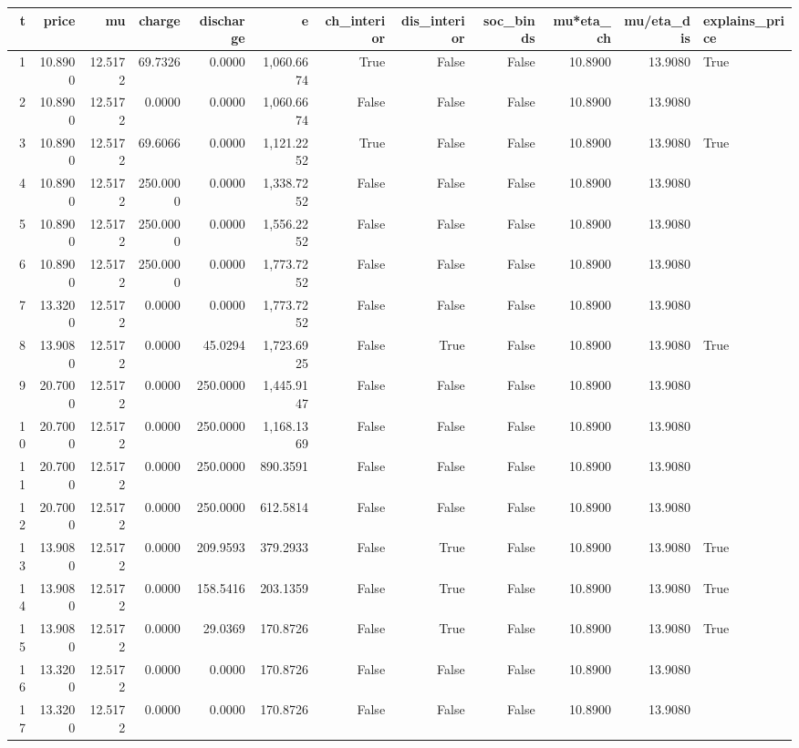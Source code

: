 \begin{tabular}{rrrrrrrrrrrl}
\toprule
t & price & mu & charge & discharge & e & ch\_interior & dis\_interior & soc\_binds & mu*eta\_ch & mu/eta\_dis & explains\_price \\
\midrule
1 & 10.8900 & 12.5172 & 69.7326 & 0.0000 & 1,060.6674 & True & False & False & 10.8900 & 13.9080 & True \\
2 & 10.8900 & 12.5172 & 0.0000 & 0.0000 & 1,060.6674 & False & False & False & 10.8900 & 13.9080 &  \\
3 & 10.8900 & 12.5172 & 69.6066 & 0.0000 & 1,121.2252 & True & False & False & 10.8900 & 13.9080 & True \\
4 & 10.8900 & 12.5172 & 250.0000 & 0.0000 & 1,338.7252 & False & False & False & 10.8900 & 13.9080 &  \\
5 & 10.8900 & 12.5172 & 250.0000 & 0.0000 & 1,556.2252 & False & False & False & 10.8900 & 13.9080 &  \\
6 & 10.8900 & 12.5172 & 250.0000 & 0.0000 & 1,773.7252 & False & False & False & 10.8900 & 13.9080 &  \\
7 & 13.3200 & 12.5172 & 0.0000 & 0.0000 & 1,773.7252 & False & False & False & 10.8900 & 13.9080 &  \\
8 & 13.9080 & 12.5172 & 0.0000 & 45.0294 & 1,723.6925 & False & True & False & 10.8900 & 13.9080 & True \\
9 & 20.7000 & 12.5172 & 0.0000 & 250.0000 & 1,445.9147 & False & False & False & 10.8900 & 13.9080 &  \\
10 & 20.7000 & 12.5172 & 0.0000 & 250.0000 & 1,168.1369 & False & False & False & 10.8900 & 13.9080 &  \\
11 & 20.7000 & 12.5172 & 0.0000 & 250.0000 & 890.3591 & False & False & False & 10.8900 & 13.9080 &  \\
12 & 20.7000 & 12.5172 & 0.0000 & 250.0000 & 612.5814 & False & False & False & 10.8900 & 13.9080 &  \\
13 & 13.9080 & 12.5172 & 0.0000 & 209.9593 & 379.2933 & False & True & False & 10.8900 & 13.9080 & True \\
14 & 13.9080 & 12.5172 & 0.0000 & 158.5416 & 203.1359 & False & True & False & 10.8900 & 13.9080 & True \\
15 & 13.9080 & 12.5172 & 0.0000 & 29.0369 & 170.8726 & False & True & False & 10.8900 & 13.9080 & True \\
16 & 13.3200 & 12.5172 & 0.0000 & 0.0000 & 170.8726 & False & False & False & 10.8900 & 13.9080 &  \\
17 & 13.3200 & 12.5172 & 0.0000 & 0.0000 & 170.8726 & False & False & False & 10.8900 & 13.9080 &  \\

\end{tabular}
